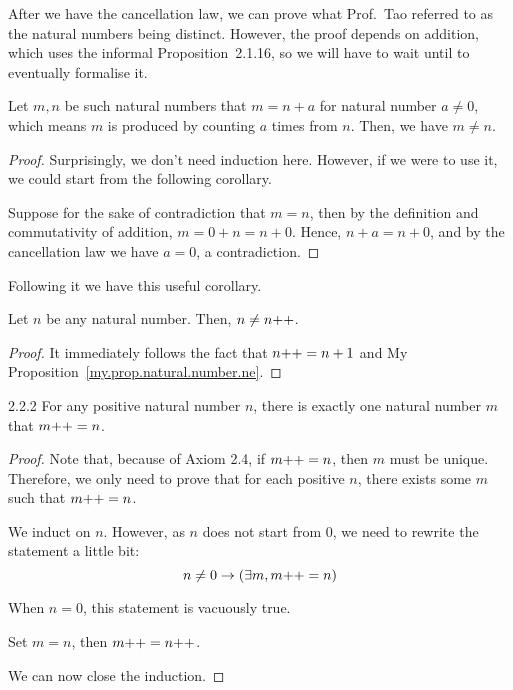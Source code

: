 After we have the cancellation law, we can prove what Prof.~Tao referred to as the natural numbers being distinct. However, the proof depends on addition, which uses the informal Proposition~2.1.16, so we will have to wait until  to eventually formalise it.
\begin{prop}\label{my.prop.natural.number.ne}
Let $m,n$ be such natural numbers that $m=n+a$ for natural number $a\ne 0$, which means $m$ is produced by counting $a$ times from $n$. Then, we have $m \ne n$.
\end{prop}
\begin{proof}
Surprisingly, we don't need induction here. However, if we were to use it, we could start from the following corollary.

Suppose for the sake of contradiction that $m=n$, then by the definition and commutativity of addition, $m=0+n=n+0$. Hence, $n+a=n+0$, and by the cancellation law we have $a=0$, a contradiction.
\end{proof}

Following it we have this useful corollary.
\begin{coro}
Let $n$ be any natural number. Then, $n\ne n{+}{+}$.
\end{coro}

\begin{proof}
It immediately follows the fact that $n{+}{+} = n+1$ and My Proposition~\ref{my.prop.natural.number.ne}.
\end{proof}

\begin{exercise}{2.2.2}
For any positive natural number $n$, there is exactly one natural number $m$ that $m{+}{+} = n$. 
\end{exercise}

\begin{proof}
Note that, because of Axiom 2.4, if $m{+}{+} = n$, then $m$ must be unique. Therefore, we only need to prove that for each positive $n$, there exists some $m$ such that $m{+}{+} = n$.
	
We induct on $n$. However, as $n$ does not start from $0$, we need to rewrite the statement a little bit:
$$
n \ne 0 \to (\exists m, m{+}{+} = n)
$$

\mybcbox When $n = 0$, this statement is vacuously true.

\myisbox Set $m=n$, then $m{+}{+} = n{+}{+}$.

We can now close the induction.
\end{proof}

